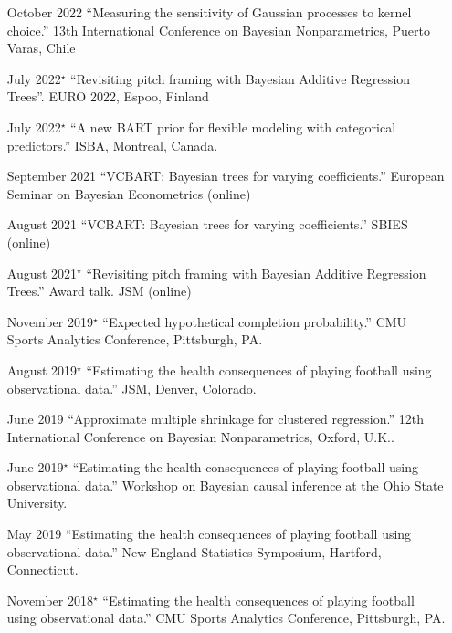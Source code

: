 \documentclass[margin]{res}
\begin{document}
\begin{resume}
{\begin{itemize}
\item[October 2022]{``Measuring the sensitivity of Gaussian processes to kernel choice.'' 13th International Conference on Bayesian Nonparametrics, Puerto Varas, Chile}

\item[July 2022$^{\star}$]{``Revisiting pitch framing with Bayesian Additive Regression Trees''. EURO 2022, Espoo, Finland}

\item[July 2022$^{\star}$]{``A new BART prior for flexible modeling with categorical predictors.'' ISBA, Montreal, Canada.}

\item[September 2021]{``VCBART: Bayesian trees for varying coefficients.'' European Seminar on Bayesian Econometrics (online)}

\item[August 2021]{``VCBART: Bayesian trees for varying coefficients.'' SBIES (online)}

\item[August 2021$^{\star}$]{``Revisiting pitch framing with Bayesian Additive Regression Trees.'' Award talk. JSM (online)}

\item[November 2019$^{\star}$]{``Expected hypothetical completion probability.'' CMU Sports Analytics Conference, Pittsburgh, PA.}

\item[August 2019$^{\star}$]{``Estimating the health consequences of playing football using observational data.'' JSM, Denver, Colorado.}

\item[June 2019]{``Approximate multiple shrinkage for clustered regression.'' 12th International Conference on Bayesian Nonparametrics, Oxford, U.K..}

\item[June 2019$^{\star}$]{``Estimating the health consequences of playing football using observational data.'' Workshop on Bayesian causal inference at the Ohio State University.}

\item[May 2019]{``Estimating the health consequences of playing football using observational data.'' New England Statistics Symposium, Hartford, Connecticut.}

\item[November 2018$^{\star}$]{``Estimating the health consequences of playing football using observational data.'' CMU Sports Analytics Conference, Pittsburgh, PA.}


\end{itemize}}
\end{resume}
\end{document}
